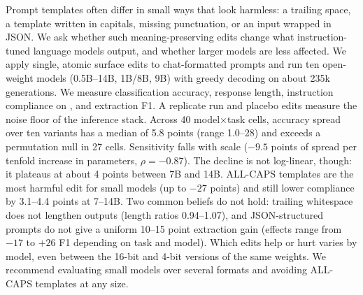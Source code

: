 Prompt templates often differ in small ways that look harmless: a trailing space, a template written in capitals, missing punctuation, or an input wrapped in JSON. We ask whether such meaning-preserving edits change what instruction-tuned language models output, and whether larger models are less affected. We apply single, atomic surface edits to chat-formatted prompts and run ten open-weight models (\qwen 0.5B--14B, \llama 1B/8B, \gemma 9B) with greedy decoding on about 235k generations. We measure classification accuracy, response length, instruction compliance on \ifeval, and extraction F1. A replicate run and placebo edits measure the noise floor of the inference stack. Across 40 model$\times$task cells, accuracy spread over ten variants has a median of 5.8 points (range 1.0--28) and exceeds a permutation null in 27 cells. Sensitivity falls with scale ($-9.5$ points of spread per tenfold increase in parameters, $\rho=-0.87$). The decline is not log-linear, though: it plateaus at about 4 points between 7B and 14B. ALL-CAPS templates are the most harmful edit for small models (up to $-27$ points) and still lower \ifeval compliance by 3.1--4.4 points at 7--14B. Two common beliefs do not hold: trailing whitespace does not lengthen outputs (length ratios 0.94--1.07), and JSON-structured prompts do not give a uniform 10--15 point extraction gain (effects range from $-17$ to $+26$ F1 depending on task and model). Which edits help or hurt varies by model, even between the 16-bit and 4-bit versions of the same weights. We recommend evaluating small models over several formats and avoiding ALL-CAPS templates at any size.
